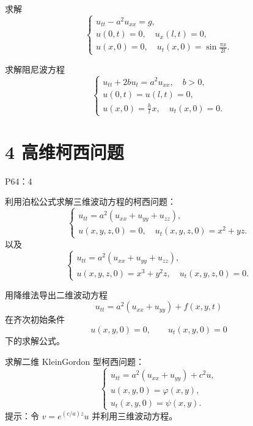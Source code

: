 \begin{homework}
[4] 求解
\[
\begin{cases}
u_{tt}-a^{2}u_{xx}=g,\\[3pt]
u(0,t)=0,\quad u_x(l,t)=0,\\[3pt]
u(x,0)=0,\quad u_t(x,0)=\sin\frac{\pi x}{2l}.
\end{cases}
\]
\end{homework}

\begin{homework}
[6] 求解阻尼波方程
\[
\begin{cases}
u_{tt}+2bu_t=a^{2}u_{xx},\quad b>0,\\[3pt]
u(0,t)=u(l,t)=0,\\[3pt]
u(x,0)=\frac{h}{l}x,\quad u_t(x,0)=0.
\end{cases}
\]
\end{homework}

\section{4 高维柯西问题}
P64：4
\begin{homework}
[1] 利用泊松公式求解三维波动方程的柯西问题：
\[
\begin{cases}
u_{tt}=a^{2}(u_{xx}+u_{yy}+u_{zz}),\\
u(x,y,z,0)=0,\quad u_t(x,y,z,0)=x^{2}+yz.
\end{cases}
\]
以及
\[
\begin{cases}
u_{tt}=a^{2}(u_{xx}+u_{yy}+u_{zz}),\\
u(x,y,z,0)=x^{3}+y^{2}z,\quad u_t(x,y,z,0)=0.
\end{cases}
\]
\end{homework}

\begin{homework}[2]
用降维法导出二维波动方程
\[
u_{tt}=a^{2}(u_{xx}+u_{yy})+f(x,y,t)
\]
在齐次初始条件
\[
u(x,y,0)=0,\qquad u_t(x,y,0)=0
\]
下的求解公式。
\end{homework}

\begin{homework}[5]
求解二维 Klein\text{--}Gordon 型柯西问题：
\[
\begin{cases}
u_{tt}=a^{2}(u_{xx}+u_{yy})+c^{2}u,\\
u(x,y,0)=\varphi(x,y),\\
u_t(x,y,0)=\psi(x,y).
\end{cases}
\]
提示：令 $v=e^{(c/a)z}u$ 并利用三维波动方程。
\end{homework}

